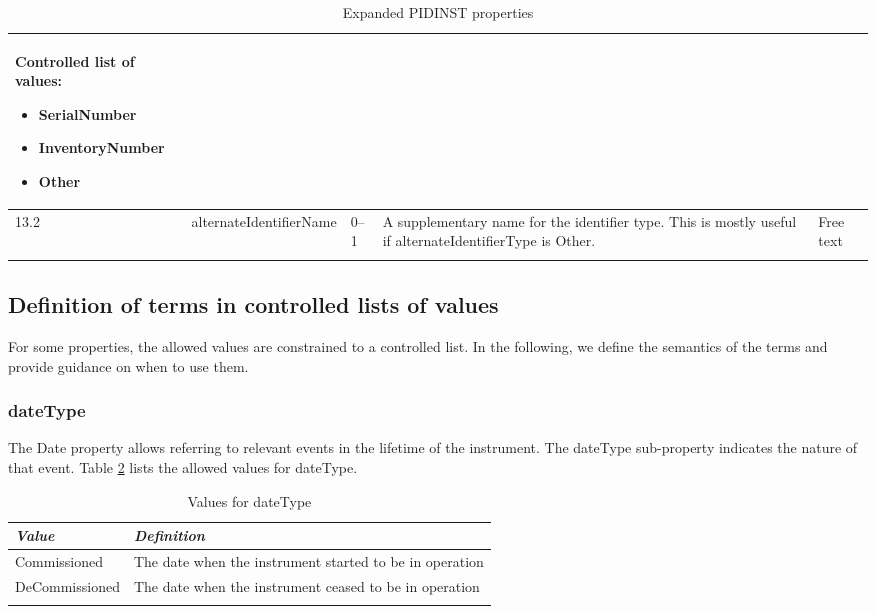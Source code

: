 \documentclass[titlepage=true,twoside=false,DIV=13]{scrartcl}
\begin{document}
\begin{longtable}{|l|l|l|p{}|p{\valcolw}|}
\begin{minipage}[t]{\valcolw}
            Controlled list of values:
            \begin{itemize}[nosep,leftmargin=3.5ex]
            \item SerialNumber
            \item InventoryNumber
            \item Other
            \end{itemize}
            \vspace{1ex}
          \end{minipage} \\
  \hline
  13.2  & alternateIdentifierName      & 0--1
        & A supplementary name for the identifier type.  This is
          mostly useful if alternateIdentifierType is Other.
        & Free text \\
  \hline
  \caption{Expanded PIDINST properties}
  \label{tab:schema:expandprops}
\end{longtable}

\subsection{Definition of terms in controlled lists of values}

For some properties, the allowed values are constrained to a
controlled list.  In the following, we define the semantics of the
terms and provide guidance on when to use them.

\newlength{\valnamecolw}\settowidth{\valnamecolw}{IsPreviousVersionOf}
\newlength{\valdefcolw}
\setlength{\valdefcolw}{\textwidth}
\addtolength{\valdefcolw}{-\valnamecolw}
\addtolength{\valdefcolw}{-4\tabcolsep}

\subsubsection{dateType}

The Date property allows referring to relevant events in the lifetime
of the instrument.  The dateType sub-property indicates the nature of
that event.  Table \ref{tab:schema:values:dateType} lists the allowed
values for dateType.

\begin{longtable}{|l|l|}
  \hline
  \emph{Value} & \emph{Definition} \\
  \hline \endhead
  \hline \endfoot\endlastfoot
  Commissioned   & The date when the instrument started to be in operation \\
  DeCommissioned & The date when the instrument ceased to be in operation \\
  \hline
  \caption{Values for dateType}
  \label{tab:schema:values:dateType}
\end{longtable}
\end{document}
